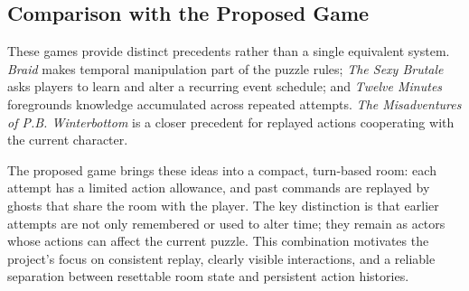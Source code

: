 \subsection{Comparison with the Proposed Game}

These games provide distinct precedents rather than a single equivalent system. \textit{Braid} makes temporal manipulation part of the puzzle rules; \textit{The Sexy Brutale} asks players to learn and alter a recurring event schedule; and \textit{Twelve Minutes} foregrounds knowledge accumulated across repeated attempts. \textit{The Misadventures of P.B. Winterbottom} is a closer precedent for replayed actions cooperating with the current character.

The proposed game brings these ideas into a compact, turn-based room: each attempt has a limited action allowance, and past commands are replayed by ghosts that share the room with the player. The key distinction is that earlier attempts are not only remembered or used to alter time; they remain as actors whose actions can affect the current puzzle. This combination motivates the project's focus on consistent replay, clearly visible interactions, and a reliable separation between resettable room state and persistent action histories.

